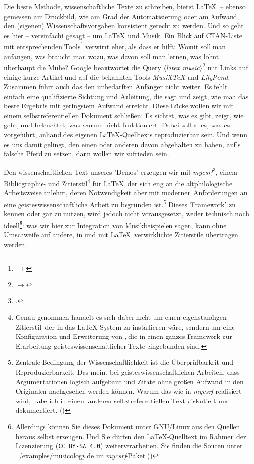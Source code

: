Die beste Methode, wissenschaftliche Texte zu schreiben, bietet \LaTeX\ --
ebenso gemessen am Druckbild, wie am Grad der Automatisierung oder am Aufwand,
den (ei\-ge\-nen) Wissenschaftsvorgaben konsistent gerecht zu werden. Und so
geht es hier -- vereinfacht gesagt -- um \LaTeX\ und Musik. Ein Blick auf
CTAN-Liste mit entsprechenden Tools\footnote{$\rightarrow$
} verwirrt eher, als dass er
hilft: Womit soll man anfangen, was braucht man wozu, was davon soll man lernen,
was lohnt überhaupt die Mühe? Google beantwortet die Query
$\langle$\textit{latex music}$\rangle$\footnote{$\rightarrow$
} mit Links auf einige kurze
Artikel und auf die bekannten Tools \textit{MusiX\TeX} und \textit{LilyPond}.
Zusammen führt auch das den unbedarften Anfänger nicht weiter. Es fehlt einfach
eine qualifizierte Sichtung und Anleitung, die sagt und zeigt, wie man das beste
Ergebnis mit geringstem Aufwand erreicht. Diese Lücke wollen wir mit einem
selbstreferentiellen Dokument schließen: Es sichtet, was es gibt, zeigt, wie
geht, und beleuchtet, was warum nicht funktioniert. Dabei soll alles, was es
vorgeführt, anhand des eigenen \LaTeX-Quelltexts reproduzierbar sein. Und wenn
es uns damit gelingt, den einen oder anderen davon abgehalten zu haben, auf's
falsche Pferd zu setzen, dann wollen wir zufrieden sein.

Den wissenschaftlichen Text unseres 'Demos' erzeugen wir mit
\textit{mycsrf}\footcite[vgl.][\nopage wp.]{Reincke2018a}, einem Bibliographie-
und Zitierstil\footnote{Genau genommen handelt es sich dabei nicht um einen
eigenständigen Zitierstil, der in das \LaTeX-System zu installieren wäre,
sondern um eine Konfiguration und Erweiterung von , die in einen
ganzes Framework zur Erarbeitung geisteswissenschaftlicher Texte eingebunden
sind.} für \LaTeX, der sich eng an die altphilologische Arbeitsweise anlehnt,
deren Notwendigkeit aber mit modernen Anforderungen an eine
geisteswissenschaftliche Arbeit zu begründen ist.\footnote{Zentrale Bedingung
der Wissenschaftlichkeit ist die Überprüfbarkeit und Reproduzierbarkeit. Das
meint bei geisteswissenschaftlichen Arbeiten, dass Argumentationen logisch
aufgebaut und Zitate ohne großen Aufwand in den Originalen nachgesehen werden
können. Warum das wie in \textit{mycsrf} realisiert wird, habe ich in einem
anderen selbstreferentiellen Text diskutiert und dokumentiert. (\cite[Vgl.
dazu][1ff]{Reincke2018b})} Dieses 'Framework' zu kennen oder gar zu nutzen, wird
jedoch nicht vorausgesetzt, weder technisch noch ideell\footnote{Allerdings
können Sie dieses Dokument unter GNU/Linux aus den Quellen heraus selbst
erzeugen. Und Sie dürfen den \LaTeX-Quelltext im Rahmen der Lizenzierung
(\texttt{CC BY-SA 4.0}) weiterverarbeiten. Sie finden die Soucen unter
~/examples/musicology.de im \textit{mycsrf}-Paket (\cite[Vgl. dazu][\nopage
wp.]{Reincke2019a})}: was wir hier zur Integration von Musikbeispielen sagen,
kann ohne Umschweife auf andere, in und mit \LaTeX\ verwirklichte Zitierstile
übertragen werden.

